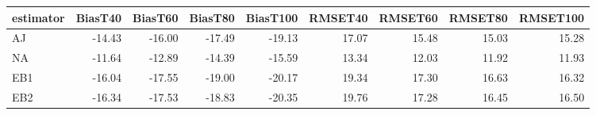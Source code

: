 \begin{table}[ht]
\centering
\begin{tabular}{lrrrrrrrr}
  \toprule
estimator & BiasT40 & BiasT60 & BiasT80 & BiasT100 & RMSET40 & RMSET60 & RMSET80 & RMSET100 \\ 
  \midrule
AJ & -14.43 & -16.00 & -17.49 & -19.13 & 17.07 & 15.48 & 15.03 & 15.28 \\ 
  NA & -11.64 & -12.89 & -14.39 & -15.59 & 13.34 & 12.03 & 11.92 & 11.93 \\ 
  EB1 & -16.04 & -17.55 & -19.00 & -20.17 & 19.34 & 17.30 & 16.63 & 16.32 \\ 
  EB2 & -16.34 & -17.53 & -18.83 & -20.35 & 19.76 & 17.28 & 16.45 & 16.50 \\ 
   \bottomrule
\end{tabular}
\end{table}
